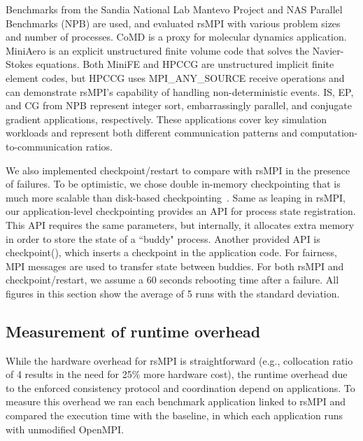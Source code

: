 Benchmarks from the Sandia National Lab Mantevo Project and NAS Parallel Benchmarks (NPB) are used, and evaluated rsMPI with various problem sizes and number of processes. 
CoMD is a proxy for molecular dynamics application. MiniAero is an explicit unstructured finite volume code that solves the Navier-Stokes equations. Both MiniFE and HPCCG are unstructured implicit finite element codes, but HPCCG uses MPI\_ANY\_SOURCE receive operations and can demonstrate rsMPI's capability of handling non-deterministic events. IS, EP, and CG from NPB represent integer sort, embarrassingly parallel, and conjugate gradient applications, respectively. These applications cover key simulation workloads and represent both different communication patterns and computation-to-communication ratios.

We also implemented checkpoint/restart to compare with rsMPI in the presence of failures. 
To be optimistic, we chose double in-memory checkpointing that is much more scalable than disk-based checkpointing~\cite{zheng_2004_ftccharm}. 
Same as leaping in rsMPI, our application-level checkpointing provides an API for process state registration. This API requires the same parameters, but internally, it allocates extra memory in order to store the state of a ``buddy" process. Another provided API is checkpoint(), which inserts a checkpoint in the application code. For fairness, MPI messages are used to transfer state between buddies.  
For both rsMPI and checkpoint/restart, we assume a 60 seconds rebooting time after a failure. All figures in this section show the average of 5 runs with the standard deviation.

\subsection{Measurement of runtime overhead}
\label{sec:runtime_overhead}
While the hardware overhead for rsMPI is straightforward (e.g., collocation ratio of 4 results in the need for 25\% more hardware cost), 
the runtime overhead due to the enforced consistency protocol and coordination depend on applications. To measure this overhead we ran each benchmark application linked to rsMPI and compared the execution time with the baseline, in which each application runs with unmodified OpenMPI.

